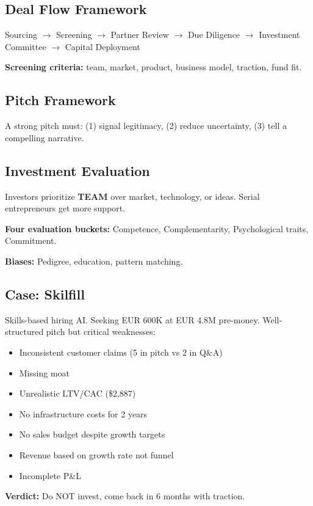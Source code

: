 \documentclass[a4paper,11pt]{article}
\begin{document}
\subsection{Deal Flow Framework}

Sourcing $\rightarrow$ Screening $\rightarrow$ Partner Review $\rightarrow$ Due Diligence $\rightarrow$ Investment Committee $\rightarrow$ Capital Deployment

\textbf{Screening criteria:} team, market, product, business model, traction, fund fit.

\subsection{Pitch Framework}

A strong pitch must: (1) signal legitimacy, (2) reduce uncertainty, (3) tell a compelling narrative.

\subsection{Investment Evaluation}

Investors prioritize \textbf{TEAM} over market, technology, or ideas. Serial entrepreneurs get more support.

\textbf{Four evaluation buckets:} Competence, Complementarity, Psychological traits, Commitment.

\textbf{Biases:} Pedigree, education, pattern matching.

\subsection{Case: Skilfill}

Skills-based hiring AI. Seeking EUR 600K at EUR 4.8M pre-money. Well-structured pitch but critical weaknesses:
\begin{itemize}
\item Inconsistent customer claims (5 in pitch vs 2 in Q\&A)
\item Missing moat
\item Unrealistic LTV/CAC (\$2,887)
\item No infrastructure costs for 2 years
\item No sales budget despite growth targets
\item Revenue based on growth rate not funnel
\item Incomplete P\&L
\end{itemize}
\textbf{Verdict:} Do NOT invest, come back in 6 months with traction.
\end{document}
